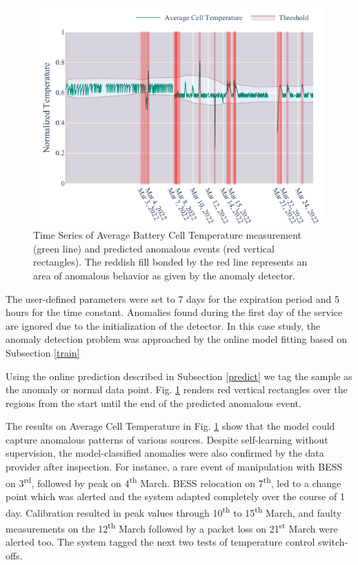 \begin{figure}[htbp]
 \centerline{\includegraphics{figures/Average_Cell_Temperature_168_hours_sliding_thresh.pdf}}
 \caption{Time Series of Average Battery Cell Temperature measurement (green line) and predicted anomalous events (red vertical rectangles). The reddish fill bonded by the red line represents an area of anomalous behavior as given by the anomaly detector.}
 \label{fig:threshold}
\end{figure}

The user-defined parameters were set to 7 days for the expiration period and 5 hours for the time constant. Anomalies found during the first day of the service are ignored due to the initialization of the detector. In this case study, the anomaly detection problem was approached by the online model fitting based on Subsection \ref{train}

Using the online prediction described in Subsection \ref{predict} we tag the sample as the anomaly or normal data point. Fig. \ref{fig:threshold} renders red vertical rectangles over the regions from the start until the end of the predicted anomalous event.

The results on Average Cell Temperature in Fig. \ref{fig:threshold} show that the model could capture anomalous patterns of various sources. Despite self-learning without supervision, the model-classified anomalies were also confirmed by the data provider after inspection. For instance, a rare event of manipulation with BESS on 3\textsuperscript{rd}, followed by peak on 4\textsuperscript{th} March. BESS relocation on 7\textsuperscript{th}, led to a change point which was alerted and the system adapted completely over the course of 1 day. Calibration resulted in peak values through 10\textsuperscript{th} to 15\textsuperscript{th} March, and faulty measurements on the 12\textsuperscript{th} March followed by a packet loss on 21\textsuperscript{st} March were alerted too. The system tagged the next two tests of temperature control switch-offs.

